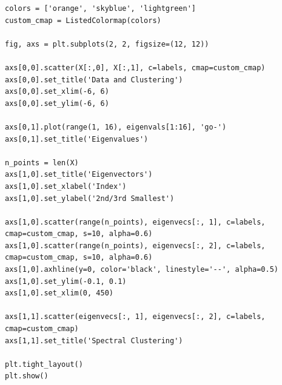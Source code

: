 \documentclass[11pt]{article}
\begin{document}
\begin{verbatim}
colors = ['orange', 'skyblue', 'lightgreen']
custom_cmap = ListedColormap(colors)

fig, axs = plt.subplots(2, 2, figsize=(12, 12))

axs[0,0].scatter(X[:,0], X[:,1], c=labels, cmap=custom_cmap)
axs[0,0].set_title('Data and Clustering')
axs[0,0].set_xlim(-6, 6)
axs[0,0].set_ylim(-6, 6)

axs[0,1].plot(range(1, 16), eigenvals[1:16], 'go-')
axs[0,1].set_title('Eigenvalues')

n_points = len(X)
axs[1,0].set_title('Eigenvectors')
axs[1,0].set_xlabel('Index')
axs[1,0].set_ylabel('2nd/3rd Smallest')

axs[1,0].scatter(range(n_points), eigenvecs[:, 1], c=labels, cmap=custom_cmap, s=10, alpha=0.6)
axs[1,0].scatter(range(n_points), eigenvecs[:, 2], c=labels, cmap=custom_cmap, s=10, alpha=0.6)
axs[1,0].axhline(y=0, color='black', linestyle='--', alpha=0.5)
axs[1,0].set_ylim(-0.1, 0.1)
axs[1,0].set_xlim(0, 450)

axs[1,1].scatter(eigenvecs[:, 1], eigenvecs[:, 2], c=labels, cmap=custom_cmap)
axs[1,1].set_title('Spectral Clustering')

plt.tight_layout()
plt.show() 	
\end{verbatim}
\end{document}
